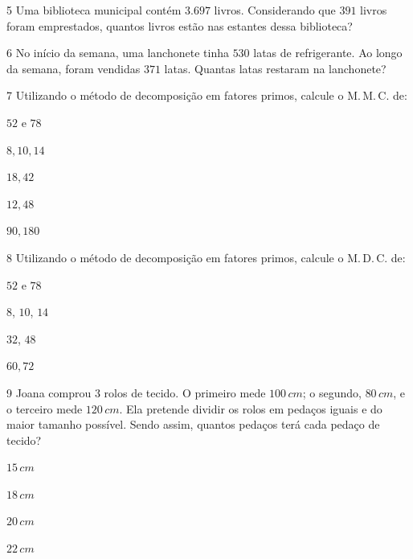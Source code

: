 
\num{5}  Uma biblioteca municipal contém $3.697$ livros. Considerando que $391$
livros foram emprestados, quantos livros estão nas estantes dessa
biblioteca?


\num{6}  No início da semana, uma lanchonete tinha $530$ latas de refrigerante.
Ao longo da semana, foram vendidas $371$ latas. Quantas latas restaram na
lanchonete?


\num{7}  Utilizando o método de decomposição em fatores primos, calcule o
M.\,M.\,C. de:

\begin{escolha}
\item $52$ e $78$ 
\item $8,10,14$ 
\item $18,42$ 
\item $12,48$ 
\item $90,180$ 
\end{escolha}

\num{8}  Utilizando o método de decomposição em fatores primos, calcule o
M.\,D.\,C. de:

\begin{escolha}
\item $52$ e $78$ 
\item $8$, $10$, $14$ 
\item $32$, $48$ 
\item $60,72$ 
\end{escolha}

\num{9} Joana comprou $3$ rolos de tecido. O primeiro mede $100\,cm$; o segundo,
$80\,cm$, e o terceiro mede $120\,cm$. Ela pretende dividir os rolos em
pedaços iguais e do maior tamanho possível. Sendo assim, quantos pedaços
terá cada pedaço de tecido?

\begin{escolha}
\item $15\,cm$ \reduline{\hfill}
\item $18\,cm$ \reduline{\hfill}
\item $20\,cm$ \reduline{\hfill}
\item $22\,cm$ 
\end{escolha}

